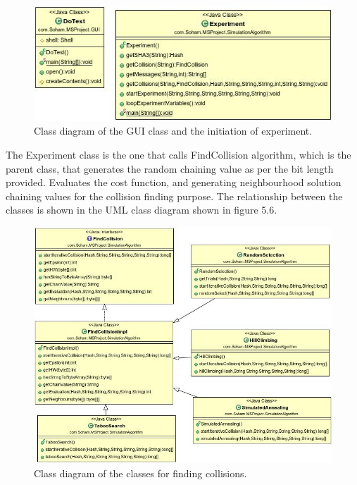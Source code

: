 \begin{figure}
  \begin{center}
    \includegraphics[width=5.65in]{ExperimentGUIClass.jpg}
  \end{center}
  \caption{Class diagram of the GUI class and the initiation of experiment.}
  \label{fig:UMLExperimentGUIClass}
\end{figure}

The Experiment class is the one that calls FindCollision algorithm, which is the parent class, that generates
the random chaining value as per the bit length provided. Evaluates the cost function, and generating neighbourhood
solution chaining values for the collision finding purpose. The relationship between the classes is shown in the
UML class diagram shown in figure 5.6.

\begin{figure}
  \begin{center}
    \includegraphics[width=7in]{FindCollisionClasses.jpg}
  \end{center}
  \caption{Class diagram of the classes for finding collisions.}
  \label{fig:UMLCollisionFindingClasses}
\end{figure}


